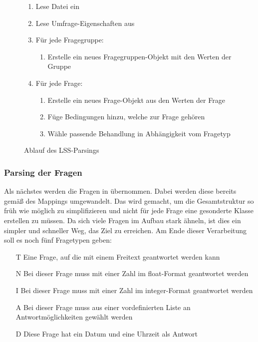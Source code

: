 \begin{figure}[h]
	\begin{enumerate}
		\item Lese Datei ein
		\item Lese Umfrage-Eigenschaften aus
		\item Für jede Fragegruppe:
			\begin{enumerate}
				\item Erstelle ein neues Fragegruppen-Objekt mit den Werten der Gruppe
			\end{enumerate}
		\item Für jede Frage:
			\begin{enumerate}
				\item Erstelle ein neues Frage-Objekt aus den Werten der Frage
				\item Füge Bedingungen hinzu, welche zur Frage gehören
				\item Wähle passende Behandlung in Abhängigkeit vom Fragetyp
			\end{enumerate}
	\end{enumerate}
	\caption{Ablauf des LSS-Parsings}
	\label{fig:lss_im}
\end{figure}

\subsubsection{Parsing der Fragen}
\label{im:q}

Als nächstes werden die Fragen in  übernommen. Dabei werden diese bereits gemäß des Mappings umgewandelt.
Das wird gemacht, um die Gesamtstruktur so früh wie möglich zu simplifizieren und nicht für jede Frage eine gesonderte Klasse erstellen zu müssen.
Da sich viele Fragen im Aufbau stark ähneln, ist dies ein simpler und schneller Weg, das Ziel zu erreichen.
Am Ende dieser Verarbeitung soll es noch fünf Fragetypen geben:

\begin{enumerate}[font=\bfseries, leftmargin=0.5cm]
\item[T] Eine Frage, auf die mit einem Freitext geantwortet werden kann
\item[N] Bei dieser Frage muss mit einer Zahl im float-Format geantwortet werden
\item[I] Bei dieser Frage muss mit einer Zahl im integer-Format geantwortet werden
\item[A] Bei dieser Frage muss aus einer vordefinierten Liste an Antwortmöglichkeiten gewählt werden
\item[D] Diese Frage hat ein Datum und eine Uhrzeit als Antwort
\end{enumerate}

